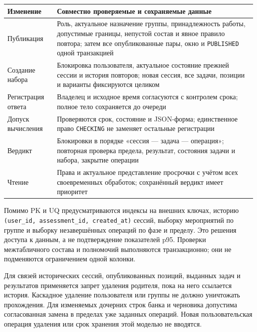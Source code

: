 \documentclass[12pt,a4paper]{article}
\newcounter{none} %
\begin{document}
\hypertarget{транзакции-индексы-и-сохранность}{}

{\def\LTcaptype{none} %
\begin{longtable}[]{@{}
  >{\raggedright\arraybackslash}p{}
  >{\raggedright\arraybackslash}p{}@{}}
\toprule\noalign{}
\begin{minipage}[b]{\linewidth}\raggedright
Изменение
\end{minipage} & \begin{minipage}[b]{\linewidth}\raggedright
Совместно проверяемые и сохраняемые данные
\end{minipage} \\
\midrule\noalign{}
\endhead
\bottomrule\noalign{}
\endlastfoot
Публикация & Роль, актуальное назначение группы, принадлежность работы, допустимые границы, непустой состав и явное правило повтора; затем все опубликованные пары, окно и \texttt{PUBLISHED} одной транзакцией \\
Создание набора & Блокировка пользователя, актуальное состояние прежней сессии и история повторов; новая сессия, все задачи, позиции и варианты фиксируются целиком \\
Регистрация ответа & Владелец и исходное время согласуются с контролем срока; полное тело сохраняется до очереди \\
Допуск вычисления & Проверяются срок, состояние и JSON-форма; единственное право \texttt{CHECKING} не заменяет остальные регистрации \\
Вердикт & Блокировки в порядке «сессия --- задача --- операция»; повторная проверка предела, результат, состояния задачи и набора, закрытие операции \\
Чтение & Права и актуальное представление просрочки с учётом всех своевременных обработок; сохранённый вердикт имеет приоритет \\
\end{longtable}
}

Помимо PK и UQ предусматриваются индексы на внешних ключах, историю \texttt{(user\_\allowbreak{}id, assessment\_\allowbreak{}id, created\_\allowbreak{}at)} сессий, выборку мероприятий по группе и выборку незавершённых операций по фазе и пределу. Это решения доступа к данным, а не подтверждение показателей p95. Проверки межтабличного состава и полномочий выполняются транзакционно; они не подменяются ограничением одной колонки.

Для связей исторических сессий, опубликованных позиций, выданных задач и результатов применяется запрет удаления родителя, пока на него ссылается история. Каскадное удаление пользователя или группы не должно уничтожать прохождения. Для изменяемых дочерних строк банка и черновика допустима согласованная замена в пределах уже заданных операций. Новая пользовательская операция удаления или срок хранения этой моделью не вводятся.
\end{document}
